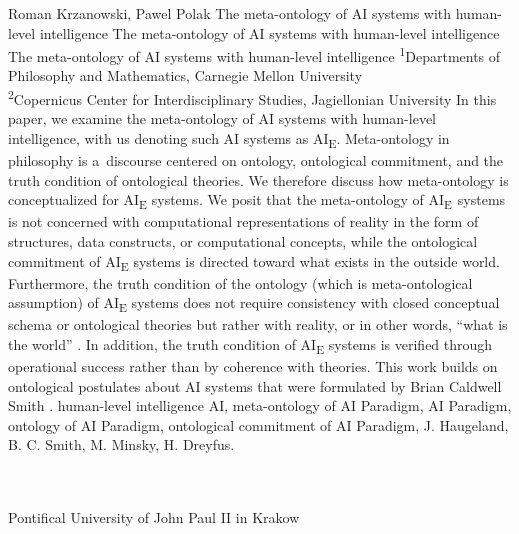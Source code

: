 \begin{artengenv2auth}{Roman Krzanowski, Pawel Polak}
	{The meta-ontology of AI systems with human-level intelligence}
	{The meta-ontology of AI systems with human-level intelligence}
	{The meta-ontology of AI systems with human-level intelligence}
	{\textsuperscript{1}Departments of Philosophy and Mathematics, Carnegie Mellon University\\
		\textsuperscript{2}Copernicus Center for Interdisciplinary Studies, Jagiellonian University}
	{\label{krzanowpolak_start}In this paper, we examine the meta-ontology of AI systems with human-level intelligence, with us denoting such AI systems as AI\textsubscript{E}. Meta-ontology in philosophy is a~discourse centered on ontology, ontological commitment, and the truth condition of ontological theories. We therefore discuss how meta-ontology is conceptualized for AI\textsubscript{E} systems. We posit that the meta-ontology of AI\textsubscript{E~}systems is not concerned with computational representations of reality in the form of structures, data constructs, or computational concepts, while the ontological commitment of AI\textsubscript{E} systems is directed toward what exists in the outside world. Furthermore, the truth condition of the ontology (which is meta-ontological assumption) of AI\textsubscript{E} systems does not require consistency with closed conceptual schema or ontological theories but rather with reality, or in other words, ``what is the world''
	\parencite[][p.57]{smith_promise_2019}. %
	 In addition, the truth condition of AI\textsubscript{E} systems is verified through operational success rather than by coherence with theories. This work builds on ontological postulates about AI systems that were formulated by Brian Caldwell Smith 
	\parencite*[][]{smith_promise_2019}.%
	}
	{human-level intelligence AI, meta-ontology of AI Paradigm, AI Paradigm, ontology of AI Paradigm, ontological commitment of AI Paradigm, J. Haugeland, B. C. Smith, M. Minsky, H. Dreyfus.}
	{%
		{\flushright{}\\\\\subsubsectit\small{Pontifical University of John Paul II in Krakow}\par}%
	}




\end{artengenv2auth}

